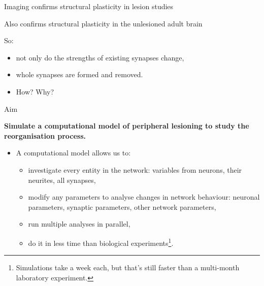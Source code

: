 \begin{frame}[c]{Imaging confirms structural plasticity in lesion studies}
    \begin{itemize}
      \item {}
        \pause{}
        \footnotesize{
      \item {}
      \item {}
      \item {}
      \item {}
      }
    \end{itemize}
\end{frame}
\begin{frame}[c]{Also confirms structural plasticity in the unlesioned adult brain}
    \begin{itemize}
      \item {}
        \pause{}
        \footnotesize{
      \item {}
      \item {}
      \item {}
      \item {}
      }
    \end{itemize}
\end{frame}
\begin{frame}[c]{So:}
  \begin{itemize}
    \item not only do the strengths of existing synapses change,
    \item \alert{whole synapses are formed and removed.}
      \pause{}
    \item How? Why?
  \end{itemize}
\end{frame}
\begin{frame}[c]{Aim}
  \begin{center}
    \textbf{Simulate a computational model of peripheral lesioning to study the reorganisation process.}
  \end{center}
  \pause{}
  \begin{itemize}
    \item A \alert{computational model} allows us to:
      \begin{itemize}
        \item investigate every entity in the network: variables from neurons, their neurites, all synapses,
        \item modify any parameters to analyse changes in network behaviour: neuronal parameters, synaptic parameters, other network parameters,
        \item run multiple analyses in parallel,
        \item do it in less time than biological experiments\footnote[1]<2->{Simulations take a week each, but that's still faster than a multi-month laboratory experiment.}.
      \end{itemize}
  \end{itemize}
\end{frame}
